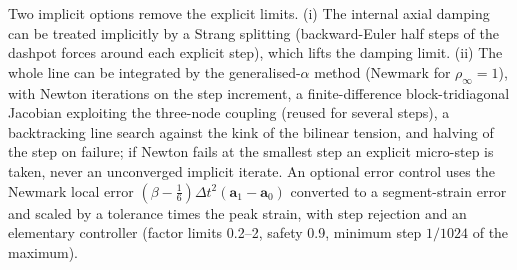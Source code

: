 \documentclass[11pt,a4paper]{article}
\newcommand{\vect}[1]{\boldsymbol{#1}}
\begin{document}
Two implicit options remove the explicit limits. (i) The internal axial damping can be treated implicitly by a Strang splitting (backward-Euler half steps of the dashpot forces around each explicit step), which lifts the damping limit. (ii) The whole line can be integrated by the generalised-$\alpha$ method (Newmark for $\rho_\infty=1$), with Newton iterations on the step increment, a finite-difference block-tridiagonal Jacobian exploiting the three-node coupling (reused for several steps), a backtracking line search against the kink of the bilinear tension, and halving of the step on failure; if Newton fails at the smallest step an explicit micro-step is taken, never an unconverged implicit iterate. An optional error control uses the Newmark local error $(\beta-\tfrac16)\Delta t^2(\vect a_1-\vect a_0)$ converted to a segment-strain error and scaled by a tolerance times the peak strain, with step rejection and an elementary controller (factor limits 0.2--2, safety 0.9, minimum step $1/1024$ of the maximum).
\end{document}
